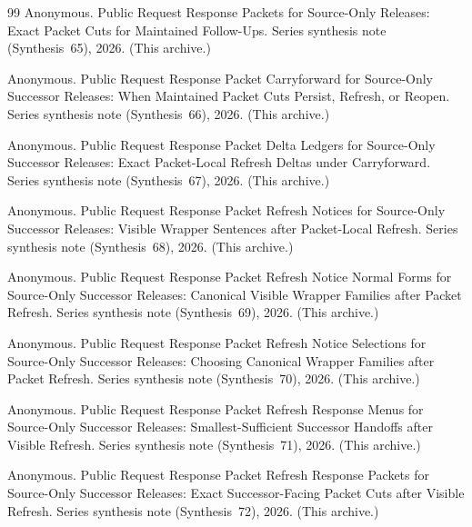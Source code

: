 \documentclass[11pt]{article}
\begin{document}
\begin{thebibliography}{99}
Anonymous.
\newblock Public Request Response Packets for Source-Only Releases: Exact Packet Cuts for Maintained Follow-Ups.
\newblock Series synthesis note (Synthesis~65), 2026. (This archive.)

Anonymous.
\newblock Public Request Response Packet Carryforward for Source-Only Successor Releases: When Maintained Packet Cuts Persist, Refresh, or Reopen.
\newblock Series synthesis note (Synthesis~66), 2026. (This archive.)

Anonymous.
\newblock Public Request Response Packet Delta Ledgers for Source-Only Successor Releases: Exact Packet-Local Refresh Deltas under Carryforward.
\newblock Series synthesis note (Synthesis~67), 2026. (This archive.)

Anonymous.
\newblock Public Request Response Packet Refresh Notices for Source-Only Successor Releases: Visible Wrapper Sentences after Packet-Local Refresh.
\newblock Series synthesis note (Synthesis~68), 2026. (This archive.)

Anonymous.
\newblock Public Request Response Packet Refresh Notice Normal Forms for Source-Only Successor Releases: Canonical Visible Wrapper Families after Packet Refresh.
\newblock Series synthesis note (Synthesis~69), 2026. (This archive.)

Anonymous.
\newblock Public Request Response Packet Refresh Notice Selections for Source-Only Successor Releases: Choosing Canonical Wrapper Families after Packet Refresh.
\newblock Series synthesis note (Synthesis~70), 2026. (This archive.)

Anonymous.
\newblock Public Request Response Packet Refresh Response Menus for Source-Only Successor Releases: Smallest-Sufficient Successor Handoffs after Visible Refresh.
\newblock Series synthesis note (Synthesis~71), 2026. (This archive.)

Anonymous.
\newblock Public Request Response Packet Refresh Response Packets for Source-Only Successor Releases: Exact Successor-Facing Packet Cuts after Visible Refresh.
\newblock Series synthesis note (Synthesis~72), 2026. (This archive.)


\end{thebibliography}
\end{document}
